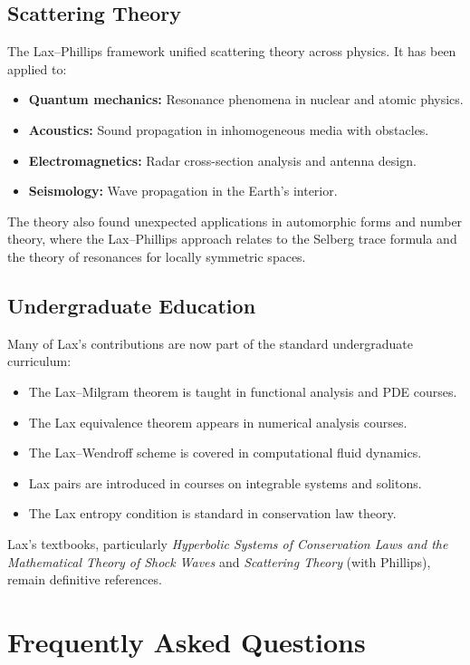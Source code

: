 \subsection{Scattering Theory}

The Lax--Phillips framework unified scattering theory across physics. It has been applied to:
\begin{itemize}
    \item \textbf{Quantum mechanics:} Resonance phenomena in nuclear and atomic physics.
    \item \textbf{Acoustics:} Sound propagation in inhomogeneous media with obstacles.
    \item \textbf{Electromagnetics:} Radar cross-section analysis and antenna design.
    \item \textbf{Seismology:} Wave propagation in the Earth's interior.
\end{itemize}

The theory also found unexpected applications in automorphic forms and number theory, where the Lax--Phillips approach relates to the Selberg trace formula and the theory of resonances for locally symmetric spaces.

\subsection{Undergraduate Education}

Many of Lax's contributions are now part of the standard undergraduate curriculum:
\begin{itemize}
    \item The Lax--Milgram theorem is taught in functional analysis and PDE courses.
    \item The Lax equivalence theorem appears in numerical analysis courses.
    \item The Lax--Wendroff scheme is covered in computational fluid dynamics.
    \item Lax pairs are introduced in courses on integrable systems and solitons.
    \item The Lax entropy condition is standard in conservation law theory.
\end{itemize}

Lax's textbooks, particularly \textit{Hyperbolic Systems of Conservation Laws and the Mathematical Theory of Shock Waves} and \textit{Scattering Theory} (with Phillips), remain definitive references.

\section{Frequently Asked Questions}

